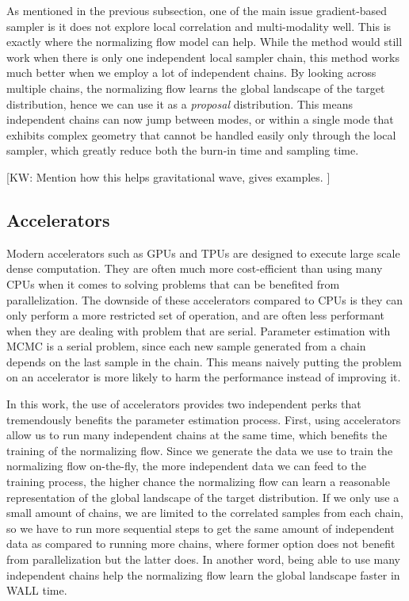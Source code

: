 \documentclass[twocolumn]{aastex631}
\newcommand{\kw}[1]{{\color{rb4}[KW: #1 ]}}
\begin{document}
As mentioned in the previous subsection, one of the main issue gradient-based
sampler is it does not explore local correlation and multi-modality well. This
is exactly where the normalizing flow model can help. While the method would
still work when there is only one independent local sampler chain, this method
works much better when we employ a lot of independent chains. By looking across
multiple chains, the normalizing flow learns the global landscape of the target
distribution, hence we can use it as a \textit{proposal} distribution. This
means independent chains can now jump between modes, or within a single mode
that exhibits complex geometry that cannot be handled easily only through the
local sampler, which greatly reduce both the burn-in time and sampling time.

\kw{Mention how this helps gravitational wave, gives examples.}


\subsection{Accelerators}
\label{sec:accelerators}

Modern accelerators such as GPUs and TPUs are designed to execute large scale
dense computation. They are often much more cost-efficient than using many CPUs
when it comes to solving problems that can be benefited from parallelization.
The downside of these accelerators compared to CPUs is they can only perform a
more restricted set of operation, and are often less performant when they are
dealing with problem that are serial. Parameter estimation with MCMC is a serial
problem, since each new sample generated from a chain depends on the last sample
in the chain. This means naively putting the problem on an accelerator is more
likely to harm the performance instead of improving it.


In this work, the use of accelerators provides two independent perks that
tremendously benefits the parameter estimation process. First, using
accelerators allow us to run many independent chains at the same time, which
benefits the training of the normalizing flow. Since we generate the data we use
to train the normalizing flow on-the-fly, the more independent data we can feed
to the training process, the higher chance the normalizing flow can learn a
reasonable representation of the global landscape of the target distribution. If
we only use a small amount of chains, we are limited to the correlated samples
from each chain, so we have to run more sequential steps to get the same amount
of independent data as compared to running more chains, where former option does
not benefit from parallelization but the latter does. In another word, being
able to use many independent chains help the normalizing flow learn the global
landscape faster in WALL time.
\end{document}
